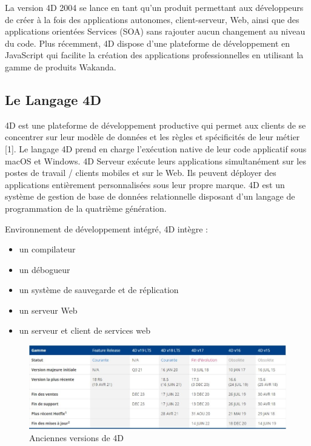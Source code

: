 La version 4D 2004 se lance en tant qu’un produit permettant aux développeurs 
de créer à la fois des applications autonomes, client-serveur, Web, 
ainsi que des applications orientées Services (SOA) sans rajouter 
aucun changement au niveau du code.
Plus récemment, 4D dispose d’une plateforme de développement 
en JavaScript qui facilite la création des applications 
professionnelles en utilisant la gamme de produits Wakanda.



\subsection{Le Langage 4D}

4D est une plateforme de développement productive qui permet aux clients
 de se concentrer sur leur modèle de données et les règles 
 et spécificités de leur métier [1].
 Le langage 4D prend en charge l’exécution native 
 de leur code applicatif sous macOS et Windows. 
 4D Serveur exécute leurs applications simultanément sur les postes de travail
/ clients mobiles et sur le Web. Ils peuvent déployer des applications 
entièrement personnalisées sous leur propre marque.
 4D est un système de gestion de base de données 
 relationnelle disposant d’un langage de programmation 
 de la quatrième génération.
\newline

Environnement de développement intégré, 4D intègre :
\begin{itemize}
    \item un compilateur
    \item un débogueur
    \item un système de sauvegarde et de réplication
    \item un serveur Web
    \item un serveur et client de services web
\end{itemize}

\begin{figure}[h]
    \centering
    \includegraphics[scale=0.7]{Images/versions.jpg} %
    \caption{Anciennes versions de 4D}
    \label{fig:AncienneVersions}
\end{figure}

